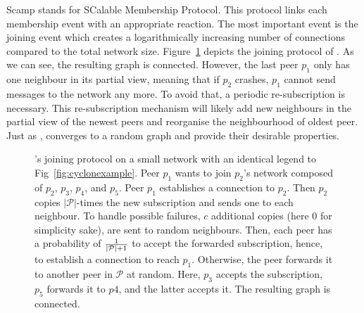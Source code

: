 \begin{asparadesc}
\item [Scamp]\cite{ganesh2001scamp,ganesh2003peer} stands for SCalable
  Membership Protocol. This protocol links each membership event with an
  appropriate reaction.  The most important event is the joining event which
  creates a logarithmically increasing number of connections compared to the
  total network size.  Figure~\ref{fig:scampexample} depicts the joining
  protocol of \SCAMP{}. As we can see, the resulting graph is
  connected. However, the last peer $p_1$ only has one neighbour in its partial
  view, meaning that if $p_2$ crashes, $p_1$ cannot send messages to the
  network any more. To avoid that, a periodic re-subscription is
  necessary. This re-subscription mechanism will likely add new neighbours in
  the partial view of the newest peers and reorganise the neighbourhood of
  oldest peer. Just as \CYCLON{}, \SCAMP{} converges to a random graph and
  provide their desirable properties.
\end{asparadesc}

\begin{figure}
  \centering
  
  \caption{\label{fig:scampexample} \SCAMP{}'s joining protocol on a small
    network with an identical legend to Fig~\ref{fig:cyclonexample}. Peer $p_1$
    wants to join $p_2$'s network composed of $p_2$, $p_3$, $p_4$, and
    $p_5$. Peer $p_1$ establishes a connection to $p_2$. Then $p_2$ copies
    $|\mathcal{P}|$-times the new subscription and sends one to each
    neighbour. To handle possible failures, $c$ additional copies (here $0$ for
    simplicity sake), are sent to random neighbours. Then, each peer has a
    probability of $1\over{|\mathcal{P}|+1}$ to accept the forwarded
    subscription, hence, to establish a connection to reach $p_1$. Otherwise,
    the peer forwards it to another peer in $\mathcal{P}$ at random. Here,
    $p_3$ accepts the subscription, $p_5$ forwards it to $p4$, and the latter
    accepts it. The resulting graph is connected.}
\end{figure}


